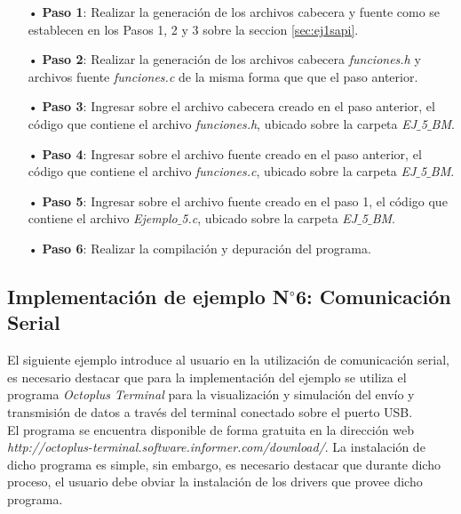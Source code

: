 \documentclass[12pt,letterpaper]{article}
\begin{document}
\begin{enumerate}
\item[•]\textbf{Paso 1}: Realizar la generación de los archivos cabecera y fuente como se establecen en los Pasos 1, 2 y 3 sobre la seccion \ref{sec:ej1sapi}.

\item[•]\textbf{Paso 2}: Realizar la generación de los archivos cabecera \textit{funciones.h} y archivos fuente \textit{funciones.c} de la misma forma que que el paso anterior.

\item[•]\textbf{Paso 3}: Ingresar sobre el archivo cabecera creado en el paso anterior, el código que contiene el archivo \textit{funciones.h}, ubicado sobre la carpeta \textit{EJ$\_$5$\_$BM}.

\item[•]\textbf{Paso 4}: Ingresar sobre el archivo fuente creado en el paso anterior, el código que contiene el archivo \textit{funciones.c}, ubicado sobre la carpeta \textit{EJ$\_$5$\_$BM}.

\item[•]\textbf{Paso 5}: Ingresar sobre el archivo fuente creado en el paso 1, el código que contiene el archivo \textit{Ejemplo$\_$5.c}, ubicado sobre la carpeta \textit{EJ$\_$5$\_$BM}.

\item[•]\textbf{Paso 6}: Realizar la compilación y depuración del programa.
\end{enumerate}




\subsection{Implementación de ejemplo N$^{\circ}$6: Comunicación Serial}\label{sec:serial}
El siguiente ejemplo introduce al usuario en la utilización de comunicación serial, es necesario destacar que para la implementación del ejemplo se utiliza el programa \textit{Octoplus Terminal} para la visualización y simulación del envío y transmisión de datos a través del terminal conectado sobre el puerto USB.
 \\
 
El programa se encuentra disponible de forma gratuita en la dirección web \textit{http://octoplus-terminal.software.informer.com/download/}. La instalación de dicho programa es simple, sin embargo, es necesario destacar que durante dicho proceso, el usuario debe obviar la instalación de los drivers que provee dicho programa.
 \\
 
\end{document}
